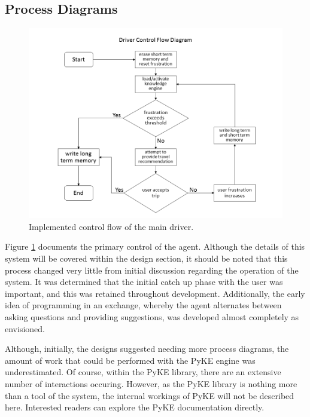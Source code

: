 \documentclass[11pt]{article} %
\begin{document}
\subsection{Process Diagrams}
\begin{figure}[!htb]
\centering
\includegraphics[width=12cm]{driver_control_flow.png}
\caption{Implemented control flow of the main driver.\label{fig:driver}}
\end{figure}

Figure \ref{fig:driver} documents the primary control of the agent. Although the details of this system will be covered within the design section, it should be noted that this process changed very little from initial discussion regarding the operation of the system. It was determined that the initial catch up phase with the user was important, and this was retained throughout development. Additionally, the early idea of programming in an exchange, whereby the agent alternates between asking questions and providing suggestions, was developed almost completely as envisioned.

Although, initially, the designs suggested needing more process diagrams, the amount of work that could be performed with the PyKE engine was underestimated. Of course, within the PyKE library, there are an extensive number of interactions occuring. However, as the PyKE library is nothing more than a tool of the system, the internal workings of PyKE will not be described here. Interested readers can explore the PyKE documentation directly\cite{pyke}.
\end{document}
